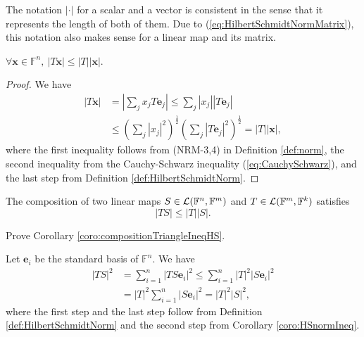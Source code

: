 \begin{rem}
  The notation $|\cdot|$ for a scalar and a vector
  is consistent in the sense that
  it represents the length of both of them.
  Due to (\ref{eq:HilbertSchmidtNormMatrix}),
  this notation also makes sense for a linear map
  and its matrix.
\end{rem}

\begin{coro}
  \label{coro:HSnormIneq}
  $\forall \mathbf{x}\in \mathbb{F}^n,\
  |T\mathbf{x}| \le |T||\mathbf{x}|$.
\end{coro}
\begin{proof}
  We have
  \begin{displaymath}
    \begin{array}{rl}
    |T \mathbf{x}| 
    &= \left|\sum_j x_j T\mathbf{e}_j\right|
    \le \sum_j |x_j| \left|T\mathbf{e}_j\right|
    \\
    &\le \left(\sum_j |x_j|^2\right)^{\frac{1}{2}}
    \left(\sum_j \left|T\mathbf{e}_j\right|^2
      \right)^{\frac{1}{2}}
      = |T||\mathbf{x}|,
    \end{array}
  \end{displaymath}
  where the first inequality follows from
  (NRM-3,4) in Definition \ref{def:norm}, 
  the second inequality from
  the Cauchy-Schwarz inequality (\ref{eq:CauchySchwarz}), 
  and the last step from Definition \ref{def:HilbertSchmidtNorm}.
\end{proof}

\begin{coro}
  \label{coro:compositionTriangleIneqHS}
  The composition of two linear maps
  \mbox{$S\in {\cal L}(\mathbb{F}^n,\mathbb{F}^m)$}
   and \mbox{$T\in {\cal L}(\mathbb{F}^m,\mathbb{F}^k)$}
  satisfies
  \begin{equation}
    \label{eq:compositionTriangleIneqHS}
    |TS| \le |T| |S|.
  \end{equation}
\end{coro}

\begin{exc}
  Prove Corollary \ref{coro:compositionTriangleIneqHS}.
\end{exc}
\begin{solution}
  Let $\mathbf{e}_i$ be the standard basis of $\mathbb{F}^n$. We have
  \begin{align*}
    |TS|^2 &= \sum\limits_{i = 1}^n|TS\mathbf{e}_i|^2
             \leq \sum\limits_{i = 1}^n|T|^2|S\mathbf{e}_i|^2
    \\
           &= |T|^2\sum\limits_{i = 1}^n|S\mathbf{e}_i|^2
             = |T|^2|S|^2, 
  \end{align*}
  where the first step and the last step follow
  from Definition \ref{def:HilbertSchmidtNorm}
  and the second step from Corollary \ref{coro:HSnormIneq}. 
\end{solution}


